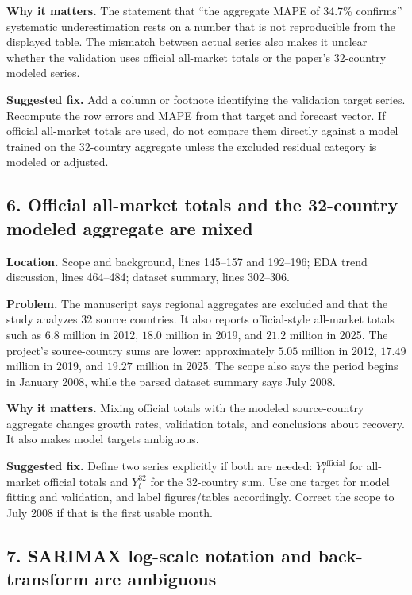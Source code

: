 \documentclass[11pt]{article}
\begin{document}
\textbf{Why it matters.} The statement that ``the aggregate MAPE of 34.7\% confirms'' systematic underestimation rests on a number that is not reproducible from the displayed table. The mismatch between actual series also makes it unclear whether the validation uses official all-market totals or the paper's 32-country modeled series.

\textbf{Suggested fix.} Add a column or footnote identifying the validation target series. Recompute the row errors and MAPE from that target and forecast vector. If official all-market totals are used, do not compare them directly against a model trained on the 32-country aggregate unless the excluded residual category is modeled or adjusted.

\subsection*{6. Official all-market totals and the 32-country modeled aggregate are mixed}

\textbf{Location.} Scope and background, lines 145--157 and 192--196; EDA trend discussion, lines 464--484; dataset summary, lines 302--306.

\textbf{Problem.} The manuscript says regional aggregates are excluded and that the study analyzes 32 source countries. It also reports official-style all-market totals such as \(6.8\) million in 2012, \(18.0\) million in 2019, and \(21.2\) million in 2025. The project's  source-country sums are lower: approximately \(5.05\) million in 2012, \(17.49\) million in 2019, and \(19.27\) million in 2025. The scope also says the period begins in January 2008, while the parsed dataset summary says July 2008.

\textbf{Why it matters.} Mixing official totals with the modeled source-country aggregate changes growth rates, validation totals, and conclusions about recovery. It also makes model targets ambiguous.

\textbf{Suggested fix.} Define two series explicitly if both are needed: \(Y^{\mathrm{official}}_t\) for all-market official totals and \(Y^{32}_t\) for the 32-country sum. Use one target for model fitting and validation, and label figures/tables accordingly. Correct the scope to July 2008 if that is the first usable month.

\subsection*{7. SARIMAX log-scale notation and back-transform are ambiguous}
\end{document}
